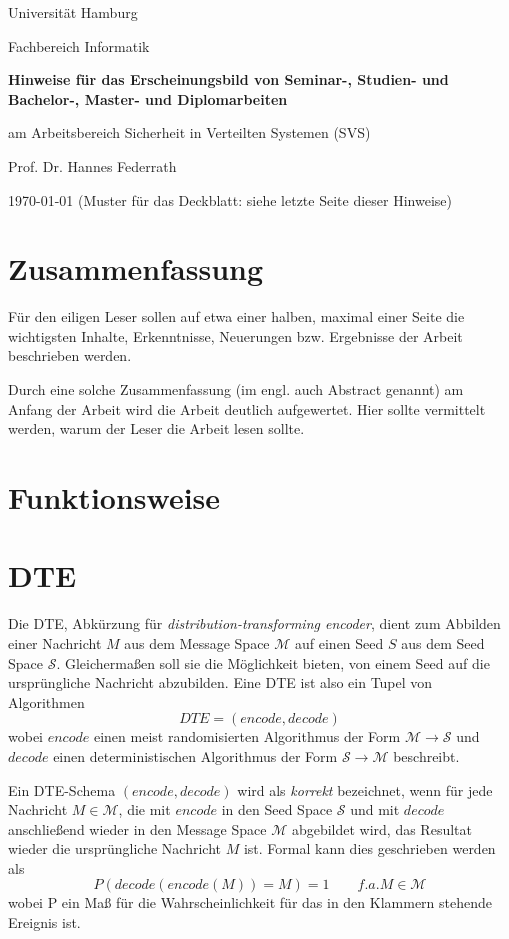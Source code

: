 \documentclass[12pt]{scrartcl}
\begin{document}
\newpage
\thispagestyle{empty}
\begin{center}\Large
Universität Hamburg \par
Fachbereich Informatik
\vfill
{\Large\textsf{\textbf{Hinweise für das Erscheinungsbild von Seminar-, Studien- und Bachelor-, Master- und Diplomarbeiten}}\par} 
\bigskip
am Arbeitsbereich Sicherheit in Verteilten Systemen (SVS) \par
\bigskip
Prof. Dr. Hannes Federrath \par
\bigskip
\today
\vfill
\vfill 
(Muster für das Deckblatt: siehe letzte Seite dieser Hinweise)
\end{center}

\newpage
\section*{Zusammenfassung}

Für den eiligen Leser sollen auf etwa einer halben, maximal einer Seite die wichtigsten Inhalte, Erkenntnisse, Neuerungen bzw. Ergebnisse der Arbeit beschrieben werden. 

Durch eine solche Zusammenfassung (im engl. auch Abstract genannt) am Anfang der Arbeit wird die Arbeit deutlich aufgewertet. Hier sollte vermittelt werden, warum der Leser die Arbeit lesen sollte.

\newpage
\tableofcontents

\section{Funktionsweise}
\label{sec:funktionsweise}

\newpage
\section{DTE}
\label{sec:dte}
Die DTE, Abkürzung für \emph{distribution-transforming encoder}, dient zum Abbilden einer Nachricht $M$ aus dem Message Space $\mathcal{M}$ auf einen Seed $S$ aus dem Seed Space $\mathcal{S}$. Gleichermaßen soll sie die Möglichkeit bieten, von einem Seed auf die ursprüngliche Nachricht abzubilden. Eine DTE ist also ein Tupel von Algorithmen
$$DTE = (encode, decode)$$
wobei $encode$ einen meist randomisierten Algorithmus der Form $\mathcal{M} \rightarrow \mathcal{S}$ und $decode$ einen deterministischen Algorithmus der Form $\mathcal{S} \rightarrow \mathcal{M}$ beschreibt.

Ein DTE-Schema $(encode, decode)$ wird als \emph{korrekt} bezeichnet, wenn für jede Nachricht $M \in \mathcal{M}$, die mit $encode$ in den Seed Space $\mathcal{S}$ und mit $decode$ anschließend wieder in den Message Space $\mathcal{M}$ abgebildet wird, das Resultat wieder die ursprüngliche Nachricht $M$  ist. Formal kann dies geschrieben werden als
$$P(decode(encode(M)) = M) = 1 \qquad f.a. M \in \mathcal{M}$$
wobei P ein Maß für die Wahrscheinlichkeit für das in den Klammern stehende Ereignis ist.
\end{document}
